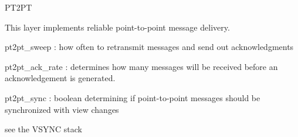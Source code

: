 %
%
%
\begin{Layer}{PT2PT} 

This layer implements reliable point-to-point message delivery.


\begin{Parameters}
\item
pt2pt\_sweep : how often to retransmit messages and send out acknowledgments
\item 
pt2pt\_ack\_rate : determines how many messages will be received before an
acknowledgement is generated.
\item 
pt2pt\_sync : boolean determining if point-to-point messages should be
synchronized with view changes
\end{Parameters}

\begin{Testing}
\item see the VSYNC stack
\end{Testing}
\end{Layer}
